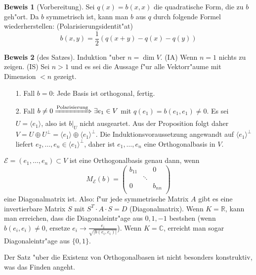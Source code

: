 \documentclass[oneside,fontsize=11pt,paper=a4,BCOR=0mm,DIV=12,automark,headsepline]{scrbook}
\theoremstyle{remark}
\theoremstyle{definition}
\theoremstyle{definition}
\newtheorem*{prof}{Beweis}
\theoremstyle{remark}
\begin{document}
\begin{prof}[Vorbereitung]
  Sei $q(x)=b(x,x)$ die quadratische Form, die zu $b$ geh"ort. Da $b$ symmetrisch
  ist, kann man $b$ aus $q$ durch folgende Formel wiederherstellen:
  (Polarisierungsidentit"at)
  \[
    b(x,y) = \frac{1}{2} (q(x+y) - q(x) - q(y))
  \]
\end{prof}
\begin{prof}[des Satzes]
  Induktion "uber $n=\dim V$. 
  (IA) Wenn $n=1$ nichts zu zeigen.
  (IS) Sei $n>1$ und es sei die Aussage f"ur alle Vektorr"aume mit Dimension $<n$
  gezeigt.
  \begin{itemize}
  \item[1. Fall] $b=0$: Jede Basis ist orthogonal, fertig.
  \item[2. Fall] $b\neq 0\xRightarrow{\text{Polarisierung}} \exists e_1\in V$ mit
    $q(e_1)=b(e_1,e_1)\neq 0$. Es sei $U=\langle e_1 \rangle$, also ist \(b|_U\) nicht ausgeartet. Aus der Proposition folgt daher \(V = U\oplus U^\perp = \langle e_1\rangle\oplus\langle e_1\rangle^\perp\). Die Induktionsvoraussetzung angewandt auf \(\langle e_1\rangle^\perp\) liefert \(e_2,\dots,e_n\in \langle e_1\rangle^\perp\), daher ist \(e_1,\dots, e_n\) eine Orthogonalbasis in \(V\).
  \end{itemize}
\end{prof}

\begin{relation}
  $\mathcal{E}=(e_1,\ldots, e_n) \subset V$ ist eine Orthogonalbasis genau dann, wenn \[
    M_{\mathcal{E}}(b)=
    \begin{pmatrix}
      b_{11} & & 0 \\
      & \ddots & \\
      0 & & b_{nn} \\
    \end{pmatrix}
  \] eine Diagonalmatrix ist. Also: f"ur jede symmetrische Matrix $A$ gibt es eine invertierbare Matrix $S$
  mit $S^T\cdot A\cdot S = D$ (Diagonalmatrix). Wenn $K=\mathbb{R}$, kann man
  erreichen, dass die Diagonaleintr"age aus ${0,1,-1}$ bestshen (wenn
  $b(e_i,e_i)\not= 0$, ersetze $e_i\rightarrow\frac{e_i}{\sqrt{|b(e_i, e_i)|}}$). Wenn \(K = \mathbb{C}\), erreicht man sogar Diagonaleintr"age aus \(\{0, 1\}\).
\end{relation}

Der Satz "uber die Existenz von Orthogonalbasen ist nicht besonders konstruktiv, was das Finden angeht.
\end{document}
